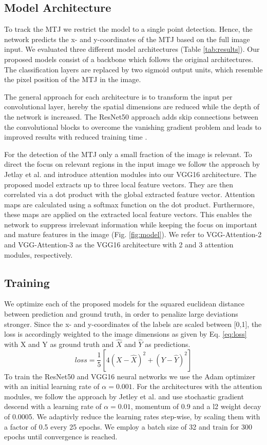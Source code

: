 \documentclass[letterpaper, 10 pt, conference]{ieeeconf}
\begin{document}
\subsection{Model Architecture}

To track the MTJ we restrict the model to a single point detection. Hence, the network predicts the x- and y-coordinates of the MTJ based on the full image input. We evaluated three different model architectures (Table \ref{tab:results}). Our proposed models consist of a backbone which follows the original architectures. The classification layers are replaced by two sigmoid output units, which resemble the pixel position of the MTJ in the image. 

The general approach for each architecture is to transform the input per convolutional layer, hereby the spatial dimensions are reduced while the depth of the network is increased. The ResNet50 approach adds skip connections between the convolutional blocks to overcome the vanishing gradient problem and leads to improved results with reduced training time \cite{Attention}. 

For the detection of the MTJ only a small fraction of the image is relevant. To direct the focus on relevant regions in the input image we follow the approach by Jetlay et al. \cite{Attention} and introduce attention modules into our VGG16 architecture. The proposed model extracts up to three local feature vectors. They are then correlated via a dot product with the global extracted feature vector. Attention maps are calculated using a softmax function on the dot product. Furthermore, these maps are applied on the extracted local feature vectors. This enables the network to suppress irrelevant information while keeping the focus on important and mature features in the image (Fig. \ref{fig:model}). We refer to VGG-Attention-2 and VGG-Attention-3 as the VGG16 architecture with 2 and 3 attention modules, respectively.
\subsection{Training}
\label{sect:training}
We optimize each of the proposed models for the squared euclidean distance between prediction and ground truth, in order to penalize large deviations stronger. Since the x- and y-coordinates of the labels are scaled between [0,1], the loss is accordingly weighted to the image dimensions as given by Eq. \ref{eq:loss} with X and Y as ground truth and $\hat{X}$ and $\hat{Y}$ as predictions.
\begin{equation}
\label{eq:loss}
    loss = \frac{1}{5}\left[4(X - \hat{X})^2 + (Y - \hat{Y})^2\right]
\end{equation}
To train the ResNet50 and VGG16 neural networks we use the Adam optimizer \cite{adam_optimizer} with an initial learning rate of $\alpha=0.001$. For the architectures with the attention modules, we follow the approach by Jetley et al. \cite{Attention} and use stochastic gradient descend with a learning rate of $\alpha=0.01$, momentum of 0.9 and a l2 weight decay of 0.0005.
We adaptivly reduce the learning rates step-wise, by scaling them with a factor of 0.5 every 25 epochs. We employ a batch size of 32 and train for 300 epochs until convergence is reached.
\end{document}
